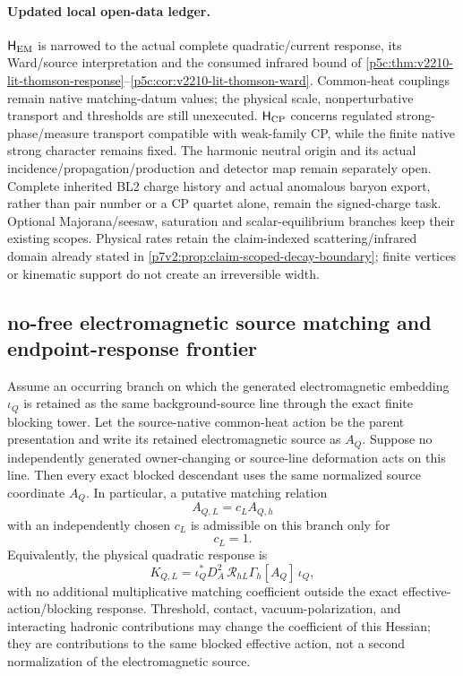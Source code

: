 \documentclass[12pt,a4paper]{article}
\newcommand{\Hem}{\mathsf{H}_{\rm EM}}
\newcommand{\Hcp}{\mathsf{H}_{\rm CP}}
\begin{document}
\paragraph{Updated local open-data ledger.}
\(\Hem\) is narrowed to the actual complete quadratic/current response,
its Ward/source interpretation and the consumed infrared bound of
\ref{p5c:thm:v2210-lit-thomson-response}--\ref{p5c:cor:v2210-lit-thomson-ward}.
Common-heat couplings remain native matching-datum values; the physical
scale, nonperturbative transport and thresholds are still unexecuted.
\(\Hcp\) concerns regulated strong-phase/measure transport compatible with
weak-family CP, while the finite native strong character remains fixed.
The harmonic neutral origin and its actual incidence/propagation/production
and detector map remain separately open.  Complete inherited BL2 charge
history and actual anomalous baryon export, rather than pair number or a CP
quartet alone, remain the signed-charge task.  Optional Majorana/seesaw,
saturation and scalar-equilibrium branches keep their existing scopes.
Physical rates retain the claim-indexed scattering/infrared domain already
stated in \ref{p7v2:prop:claim-scoped-decay-boundary}; finite vertices or
kinematic support do not create an irreversible width.



\subsection{no-free electromagnetic source matching and endpoint-response frontier}
\label{p5c:sec:v275-g17-no-free-matching}

\begin{theorem}
\label{p5c:thm:v275-no-free-em-matching}
Assume an occurring branch on which the generated electromagnetic embedding
$\iota_Q$ is retained as the same background-source line through the exact
finite blocking tower.  Let the source-native common-heat action be the parent
presentation and write its retained electromagnetic source as $A_Q$.  Suppose
no independently generated owner-changing or source-line deformation acts on
this line.  Then every exact blocked descendant uses the same normalized source
coordinate $A_Q$.  In particular, a putative matching relation
\[
 A_{Q,L}=c_LA_{Q,h}
\]
with an independently chosen $c_L$ is admissible on this branch only for
\[
 \boxed{c_L=1.}
\]
Equivalently, the physical quadratic response is
\[
 \boxed{
 K_{Q,L}=\iota_Q^*D_A^2\,\mathscr R_{hL}\Gamma_h[A_Q] \,\iota_Q ,}
\]
with no additional multiplicative matching coefficient outside the exact
effective-action/blocking response.  Threshold, contact, vacuum-polarization,
and interacting hadronic contributions may change the coefficient of this
Hessian; they are contributions to the same blocked effective action, not a
second normalization of the electromagnetic source.
\end{theorem}
\end{document}
